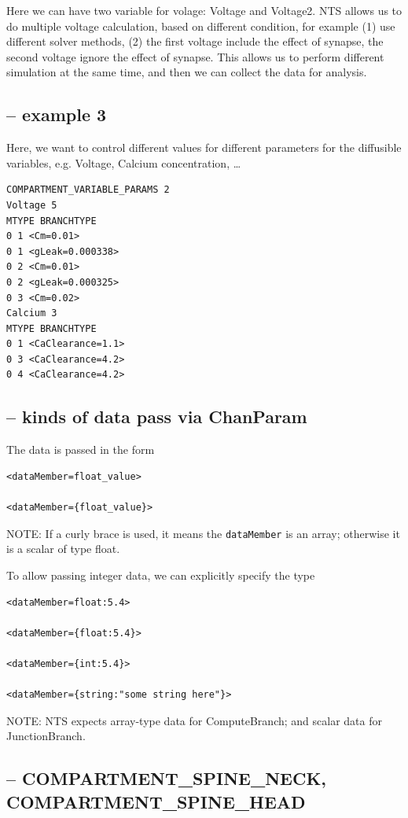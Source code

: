 Here we can have two variable for volage: Voltage and Voltage2. NTS allows us to
do multiple voltage calculation, based on different condition, for example (1)
use different solver methods, (2) the first voltage include the effect of
synapse, the second voltage ignore the effect of synapse. This allows us to
perform different simulation at the same time, and then we can collect the data
for analysis.

\subsection{-- example 3}

Here, we want to control different values for different parameters for the
diffusible variables, e.g. Voltage, Calcium concentration, \ldots

\begin{verbatim}
COMPARTMENT_VARIABLE_PARAMS 2
Voltage 5
MTYPE BRANCHTYPE
0 1 <Cm=0.01>
0 1 <gLeak=0.000338>
0 2 <Cm=0.01>
0 2 <gLeak=0.000325>
0 3 <Cm=0.02>
Calcium 3
MTYPE BRANCHTYPE
0 1 <CaClearance=1.1>
0 3 <CaClearance=4.2>
0 4 <CaClearance=4.2>
\end{verbatim}

\subsection{-- kinds of data pass via ChanParam}

The data is passed in the form
\begin{verbatim}
<dataMember=float_value>

<dataMember={float_value}>
\end{verbatim}
NOTE: If a curly brace is used, it means the \verb!dataMember! is an array;
otherwise it is a scalar of type float.

To allow passing integer data, we can explicitly specify the type
\begin{verbatim}
<dataMember=float:5.4>

<dataMember={float:5.4}>

<dataMember={int:5.4}>

<dataMember={string:"some string here"}>

\end{verbatim}

NOTE: NTS expects array-type data for ComputeBranch; and scalar data for
JunctionBranch.

\subsection{-- COMPARTMENT\_SPINE\_NECK, COMPARTMENT\_SPINE\_HEAD}
\label{sec:COMPARTMENT_SPINE_NECK}
\label{sec:COMPARTMENT_SPINE_HEAD}

